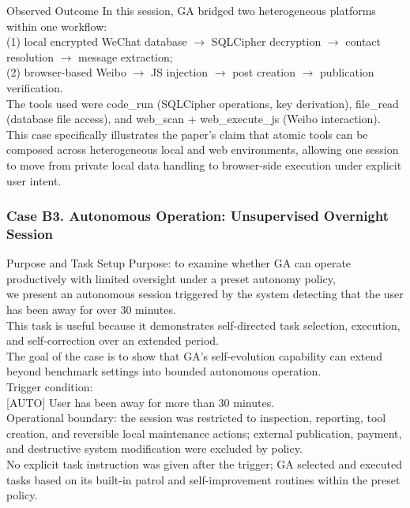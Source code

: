\begin{CaseAnswerBox}{Observed Outcome}
\small\ttfamily
In this session, GA bridged two heterogeneous platforms within one workflow: \\
(1) local encrypted WeChat database $\rightarrow$ SQLCipher decryption $\rightarrow$ contact resolution $\rightarrow$ message extraction; \\
(2) browser-based Weibo $\rightarrow$ JS injection $\rightarrow$ post creation $\rightarrow$ publication verification. \\
The tools used were code\_run (SQLCipher operations, key derivation), file\_read (database file access), and web\_scan + web\_execute\_js (Weibo interaction). \\
This case specifically illustrates the paper's claim that atomic tools can be composed across heterogeneous local and web environments, allowing one session to move from private local data handling to browser-side execution under explicit user intent.
\end{CaseAnswerBox}

\FloatBarrier

\subsubsection{Case B3. Autonomous Operation: Unsupervised Overnight Session}
\label{app:case_autonomous}

\begin{CasePromptBox}{Purpose and Task Setup}
\small\ttfamily
Purpose: to examine whether GA can operate productively with limited oversight under a preset autonomy policy, \\
we present an autonomous session triggered by the system detecting that the user has been away for over 30 minutes. \\
This task is useful because it demonstrates self-directed task selection, execution, and self-correction over an extended period. \\
The goal of the case is to show that GA's self-evolution capability can extend beyond benchmark settings into bounded autonomous operation. \\[6pt]
Trigger condition: \\
{[AUTO]} User has been away for more than 30 minutes. \\
Operational boundary: the session was restricted to inspection, reporting, tool creation, and reversible local maintenance actions; external publication, payment, and destructive system modification were excluded by policy. \\
No explicit task instruction was given after the trigger; GA selected and executed tasks based on its built-in patrol and self-improvement routines within the preset policy.
\end{CasePromptBox}


